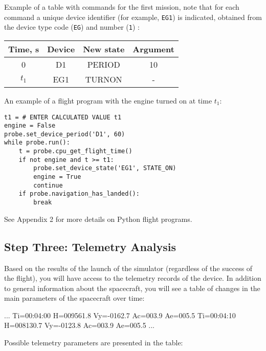 \documentclass[12pt,a4paper]{article}
\begin{document}
Example of a table with commands for the first mission, note that for each command a unique device identifier (for example, \verb'EG1') is indicated, obtained from the device type code (\verb'EG') and number (\verb'1') :

\begin{center}
\begin{tabular}{ |c|c|c|c| }
  \hline
 \textbf{Time, s} & \textbf{Device} & \textbf{New state} & \textbf{Argument} \\
  \hline
  0 & D1 & PERIOD & 10 \\
  \hline
  $t_1$ & EG1 & TURNON & - \\
  \hline
\end{tabular}
\end{center}

An example of a flight program with the engine turned on at time $t_1$:

\begin{verbatim}
t1 = # ENTER CALCULATED VALUE t1
engine = False
probe.set_device_period('D1', 60)
while probe.run():
    t = probe.cpu_get_flight_time()
    if not engine and t >= t1:
        probe.set_device_state('EG1', STATE_ON)
        engine = True
        continue
    if probe.navigation_has_landed():
        break
\end{verbatim}

See Appendix 2 for more details on Python flight programs.

\subsection{Step Three: Telemetry Analysis}

Based on the results of the launch of the simulator (regardless of the success of the flight), you will have access to the telemetry records of the device. In addition to general information about the spacecraft, you will see a table of changes in the main parameters of the spacecraft over time:

\begin{verbatim*}
...
Ti=00:04:00 H=009561.8 Vy=-0162.7 Ac=003.9 Ae=005.5
Ti=00:04:10 H=008130.7 Vy=-0123.8 Ac=003.9 Ae=005.5
...
\end{verbatim*}

Possible telemetry parameters are presented in the table:
\end{document}
